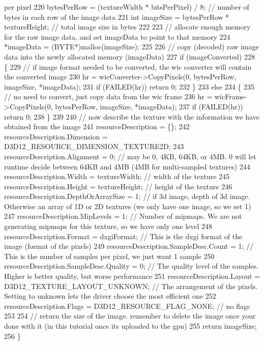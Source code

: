 \begin{DoxyCode}
{       per pixel}
220     bytesPerRow = (textureWidth * bitsPerPixel) / 8; \textcolor{comment}{// number of bytes in each row of the image data}
221     \textcolor{keywordtype}{int} imageSize = bytesPerRow * textureHeight; \textcolor{comment}{// total image size in bytes}
222 
223                                                  \textcolor{comment}{// allocate enough memory for the raw image data, and set
       imageData to point to that memory}
224     *imageData = (BYTE*)malloc(imageSize);
225 
226     \textcolor{comment}{// copy (decoded) raw image data into the newly allocated memory (imageData)}
227     \textcolor{keywordflow}{if} (imageConverted)
228     \{
229         \textcolor{comment}{// if image format needed to be converted, the wic converter will contain the converted image}
230         hr = wicConverter->CopyPixels(0, bytesPerRow, imageSize, *imageData);
231         \textcolor{keywordflow}{if} (FAILED(hr)) \textcolor{keywordflow}{return} 0;
232     \}
233     \textcolor{keywordflow}{else}
234     \{
235         \textcolor{comment}{// no need to convert, just copy data from the wic frame}
236         hr = wicFrame->CopyPixels(0, bytesPerRow, imageSize, *imageData);
237         \textcolor{keywordflow}{if} (FAILED(hr)) \textcolor{keywordflow}{return} 0;
238     \}
239 
240     \textcolor{comment}{// now describe the texture with the information we have obtained from the image}
241     resourceDescription = \{\};
242     resourceDescription.Dimension = D3D12\_RESOURCE\_DIMENSION\_TEXTURE2D;
243     resourceDescription.Alignment = 0; \textcolor{comment}{// may be 0, 4KB, 64KB, or 4MB. 0 will let runtime decide between
       64KB and 4MB (4MB for multi-sampled textures)}
244     resourceDescription.Width = textureWidth; \textcolor{comment}{// width of the texture}
245     resourceDescription.Height = textureHeight; \textcolor{comment}{// height of the texture}
246     resourceDescription.DepthOrArraySize = 1; \textcolor{comment}{// if 3d image, depth of 3d image. Otherwise an array of 1D
       or 2D textures (we only have one image, so we set 1)}
247     resourceDescription.MipLevels = 1; \textcolor{comment}{// Number of mipmaps. We are not generating mipmaps for this
       texture, so we have only one level}
248     resourceDescription.Format = dxgiFormat; \textcolor{comment}{// This is the dxgi format of the image (format of the pixels)}
249     resourceDescription.SampleDesc.Count = 1; \textcolor{comment}{// This is the number of samples per pixel, we just want 1
       sample}
250     resourceDescription.SampleDesc.Quality = 0; \textcolor{comment}{// The quality level of the samples. Higher is better
       quality, but worse performance}
251     resourceDescription.Layout = D3D12\_TEXTURE\_LAYOUT\_UNKNOWN; \textcolor{comment}{// The arrangement of the pixels. Setting to
       unknown lets the driver choose the most efficient one}
252     resourceDescription.Flags = D3D12\_RESOURCE\_FLAG\_NONE; \textcolor{comment}{// no flags}
253 
254                                                           \textcolor{comment}{// return the size of the image. remember to
       delete the image once your done with it (in this tutorial once its uploaded to the gpu)}
255     \textcolor{keywordflow}{return} imageSize;
256 \}
\end{DoxyCode}


